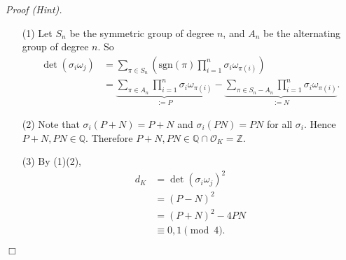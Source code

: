 \documentclass{article}
\begin{document}
\emph{Proof (Hint).}
\begin{enumerate}
\item[(1)]
  Let $S_n$ be the symmetric group of degree $n$, and
  $A_n$ be the alternating group of degree $n$.
  So
  \begin{align*}
    \det(\sigma_i \omega_j)
    &= \sum_{\pi \in S_n}
      \left( \mathrm{sgn}(\pi) \prod_{i=1}^{n} \sigma_i \omega_{\pi(i)} \right) \\
    &= \underbrace{\sum_{\pi \in A_n} \prod_{i=1}^{n} \sigma_i \omega_{\pi(i)}}_{:= P}
      - \underbrace{\sum_{\pi \in S_n - A_n} \prod_{i=1}^{n} \sigma_i \omega_{\pi(i)}}_{:= N}.
  \end{align*}

\item[(2)]
  Note that $\sigma_i(P+N) = P+N$ and $\sigma_i(PN) = PN$ for all $\sigma_i$.
  Hence $P+N, PN \in \mathbb{Q}$.
  Therefore $P+N, PN \in \mathbb{Q} \cap \mathcal{O}_K = \mathbb{Z}$.

\item[(3)]
  By (1)(2),
  \begin{align*}
    d_K
    &= \det(\sigma_i \omega_j)^2 \\
    &= (P-N)^2 \\
    &= (P+N)^2 - 4PN \\
    &\equiv 0, 1 \pmod 4.
  \end{align*}
\end{enumerate}
$\Box$ \\\\



\end{document}
